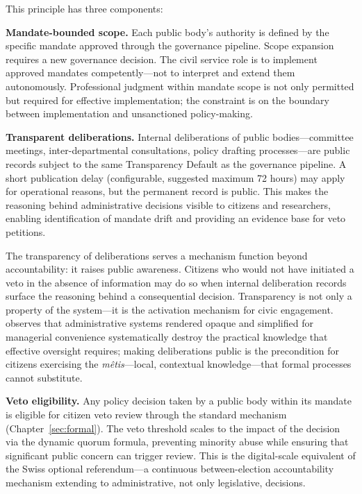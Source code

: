 \documentclass[12pt,a4paper,oneside]{report}
\begin{document}
This principle has three components:

\textbf{Mandate-bounded scope.} Each public body's authority is defined by the specific mandate approved through the governance pipeline. Scope expansion requires a new governance decision. The civil service role is to implement approved mandates competently---not to interpret and extend them autonomously. Professional judgment within mandate scope is not only permitted but required for effective implementation; the constraint is on the boundary between implementation and unsanctioned policy-making.

\textbf{Transparent deliberations.} Internal deliberations of public bodies---committee meetings, inter-departmental consultations, policy drafting processes---are public records subject to the same Transparency Default as the governance pipeline. A short publication delay (configurable, suggested maximum 72 hours) may apply for operational reasons, but the permanent record is public. This makes the reasoning behind administrative decisions visible to citizens and researchers, enabling identification of mandate drift and providing an evidence base for veto petitions.

The transparency of deliberations serves a mechanism function beyond accountability: it raises public awareness. Citizens who would not have initiated a veto in the absence of information may do so when internal deliberation records surface the reasoning behind a consequential decision. Transparency is not only a property of the system---it is the activation mechanism for civic engagement. \citet{scott1998seeing} observes that administrative systems rendered opaque and simplified for managerial convenience systematically destroy the practical knowledge that effective oversight requires; making deliberations public is the precondition for citizens exercising the \textit{m\^etis}---local, contextual knowledge---that formal processes cannot substitute.

\textbf{Veto eligibility.} Any policy decision taken by a public body within its mandate is eligible for citizen veto review through the standard mechanism (Chapter~\ref{sec:formal}). The veto threshold scales to the impact of the decision via the dynamic quorum formula, preventing minority abuse while ensuring that significant public concern can trigger review. This is the digital-scale equivalent of the Swiss optional referendum---a continuous between-election accountability mechanism extending to administrative, not only legislative, decisions.
\end{document}
